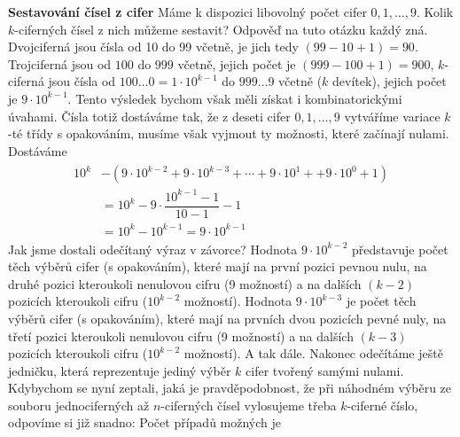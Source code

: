 \begin{mdframed}[style=mdexam]
  \begin{example}\label{mai:exam054}
    \textbf{Sestavování čísel z cifer}\newline
    Máme k dispozici libovolný počet cifer \(0, 1, \ldots, 9\). Kolik \(k\)-ciferných čísel z nich
    můžeme sestavit? Odpověď na tuto otázku každý zná. Dvojciferná jsou čísla od \num{10} do
    \num{99} včetně, je jich tedy \((99 - 10 + 1) = 90\). Trojciferná jsou od \(100\) do \(999\)
    včetně, jejich počet je \((999 - 100 + 1) = 900\), \(k\)-ciferná jsou čísla od \(100\ldots0 =
    1\cdot10^{k-1}\) do \(999\ldots9\) včetně (\(k\) devítek), jejich počet je \(9\cdot10^{k-1}\).
    Tento výsledek bychom však měli získat i kombinatorickými úvahami. Čísla totiž dostáváme tak, že
    z deseti cifer \(0, 1,\ldots, 9\) vytváříme variace \(k\)-té třídy s opakováním, musíme však
    vyjmout ty možnosti, které začínají nulami. Dostáváme
    \begin{gather*}
      \begin{aligned}
        10^k &- 
          \left(
            9\cdot10^{k-2} + 9\cdot10^{k-3} + \cdots + 9\cdot10^1 + + 9\cdot10^0 + 1 
          \right)                                                                     \\
            &= 10^k - 9\cdot\dfrac{10^{k-1} - 1}{10 - 1} - 1                          \\
            &= 10^k - 10^{k-1} = 9\cdot10^{k-1}
      \end{aligned}
    \end{gather*}
    Jak jsme dostali odečítaný výraz v závorce? Hodnota \(9\cdot10^{k-2}\) představuje počet těch
    výběrů cifer (s opakováním), které mají na první pozici pevnou nulu, na druhé pozici kteroukoli
    nenulovou cifru (\num{9} možností) a na dalších \((k - 2)\) pozicích kteroukoli cifru
    (\(10^{k-2}\) možností). Hodnota \(9\cdot10^{k-3}\) je počet těch výběrů cifer (s opakováním),
    které mají na prvních dvou pozicích pevné nuly, na třetí pozici kteroukoli nenulovou cifru
    (\num{9} možností) a na dalších \((k - 3)\) pozicích kteroukoli cifru (\(10^{k-2}\) možností). A
    tak dále. Nakonec odečítáme ještě jedničku, která reprezentuje jediný výběr \(k\) cifer tvořený
    samými nulami. Kdybychom se nyní zeptali, jaká je pravděpodobnost, že při náhodném výběru ze
    souboru jednociferných až \(n\)-ciferných čísel vylosujeme třeba \(k\)-ciferné číslo, odpovíme
    si již snadno: Počet případů možných je
    \begin{equation*}

\end{equation*}
\end{example}
\end{mdframed}
